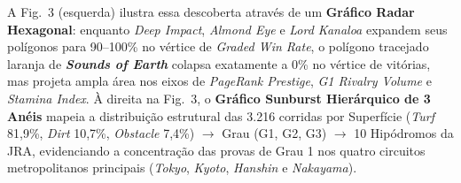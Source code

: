 \documentclass[conference]{IEEEtran}
\begin{document}
\begin{table}[htbp]
\caption{Anomalias Descobertas pelo PageRank Esportivo: ``Diamantes Injustiçados'' (0 Vitórias Graded) e ``Colecionadores de Prata'' (0 Vitórias G1)}
\begin{center}
\renewcommand{\arraystretch}{1.12}
\setlength{\tabcolsep}{3.5pt}
\label{tab:pagerank_anomalies}
\end{center}
\end{table}

A Fig.~3 (esquerda) ilustra essa descoberta através de um \textbf{Gráfico Radar Hexagonal}: enquanto \textit{Deep Impact}, \textit{Almond Eye} e \textit{Lord Kanaloa} expandem seus polígonos para 90--100\%
no vértice de \textit{Graded Win Rate}, o polígono tracejado laranja de \textbf{\textit{Sounds of Earth}} colapsa exatamente a 0\%
no vértice de vitórias, mas projeta ampla área nos eixos de \textit{PageRank Prestige}, \textit{G1 Rivalry Volume} e \textit{Stamina Index}. À direita na Fig.~3, o \textbf{Gráfico Sunburst Hierárquico de 3 Anéis} mapeia a distribuição estrutural das 3.216 corridas por Superfície (\textit{Turf} 81,9\%,
\textit{Dirt} 10,7\%,
\textit{Obstacle} 7,4\%)
$\to$ Grau (G1, G2, G3) $\to$ 10 Hipódromos da JRA, evidenciando a concentração das provas de Grau 1 nos quatro circuitos metropolitanos principais (\textit{Tokyo}, \textit{Kyoto}, \textit{Hanshin} e \textit{Nakayama}).
\end{document}
